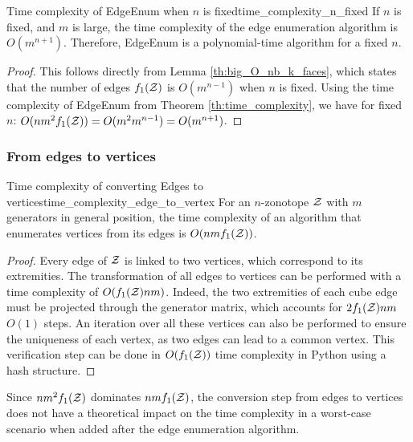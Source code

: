 \begin{theorembox}{Time complexity of EdgeEnum when $n$ is fixed}{time_complexity_n_fixed}
    If $n$ is fixed, and $m$ is large, the time complexity of the edge enumeration algorithm is $O(m^{n+1})$. Therefore, EdgeEnum is a polynomial-time algorithm for a fixed $n$.
\end{theorembox}
\begin{proof}
    This follows directly from Lemma \ref{th:big_O_nb_k_faces}, which states that the number of edges $f_1(\mathcal{Z})$ is $O(m^{n-1})$ when $n$ is fixed. Using the time complexity of EdgeEnum from Theorem \ref{th:time_complexity}, we have for fixed $n$: $O(nm^2f_1(\mathcal{Z})) = O(m^2m^{n-1}) = O(m^{n+1})$.
\end{proof}

\subsubsection*{From edges to vertices}
\begin{theorembox}{Time complexity of converting Edges to vertices}{time_complexity_edge_to_vertex}
    For an $n$-zonotope $\mathcal{Z}$ with $m$ generators in general position, the time complexity of an algorithm that enumerates vertices from its edges is $O(nmf_1(\mathcal{Z}))$.
\end{theorembox}
\begin{proof}
Every edge of $\mathcal{Z}$ is linked to two vertices, which correspond to its extremities. The transformation of all edges to vertices can be performed with a time complexity of $O(f_1(\mathcal{Z})nm)$. Indeed, the two extremities of each cube edge must be projected through the generator matrix, which accounts for $2f_1(\mathcal{Z})nm$ $O(1)$ steps. An iteration over all these vertices can also be performed to ensure the uniqueness of each vertex, as two edges can lead to a common vertex. This verification step can be done in $O(f_1(\mathcal{Z}))$ time complexity in Python using a hash structure.
\end{proof}
    
Since $nm^2f_1(\mathcal{Z})$ dominates $nmf_1(\mathcal{Z})$, the conversion step from edges to vertices does not have a theoretical impact on the time complexity in a worst-case scenario when added after the edge enumeration algorithm.

